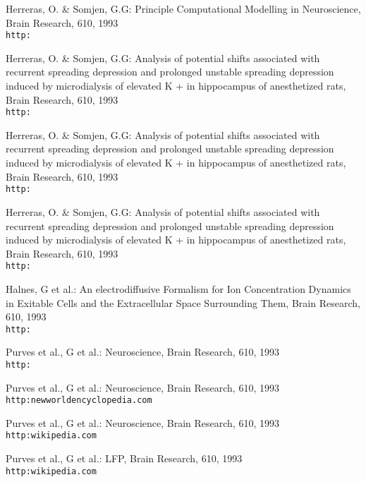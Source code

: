 \documentclass{article}
\begin{document}
\begin{thebibliography}{1}
Herreras, O. \& Somjen, G.G: Principle Computational Modelling in Neuroscience,
Brain Research, 610, 1993
\\\texttt{http:}

Herreras, O. \& Somjen, G.G: Analysis of potential shifts associated with recurrent spreading
depression and prolonged unstable spreading depression induced by
microdialysis of elevated K + in hippocampus of anesthetized rats,
Brain Research, 610, 1993
\\\texttt{http:}

Herreras, O. \& Somjen, G.G: Analysis of potential shifts associated with recurrent spreading
depression and prolonged unstable spreading depression induced by
microdialysis of elevated K + in hippocampus of anesthetized rats,
Brain Research, 610, 1993
\\\texttt{http:}

Herreras, O. \& Somjen, G.G: Analysis of potential shifts associated with recurrent spreading
depression and prolonged unstable spreading depression induced by
microdialysis of elevated K + in hippocampus of anesthetized rats,
Brain Research, 610, 1993
\\\texttt{http:}



Halnes, G et al.: An electrodiffusive Formalism for Ion Concentration Dynamics in Exitable Cells and the Extracellular Space Surrounding Them,
Brain Research, 610, 1993
\\\texttt{http:}

Purves et al., G et al.: Neuroscience,
Brain Research, 610, 1993
\\\texttt{http:}

Purves et al., G et al.: Neuroscience,
Brain Research, 610, 1993
\\\texttt{http:newworldencyclopedia.com}

Purves et al., G et al.: Neuroscience,
Brain Research, 610, 1993
\\\texttt{http:wikipedia.com}

Purves et al., G et al.: LFP,
Brain Research, 610, 1993
\\\texttt{http:wikipedia.com}




\end{thebibliography}
\end{document}
